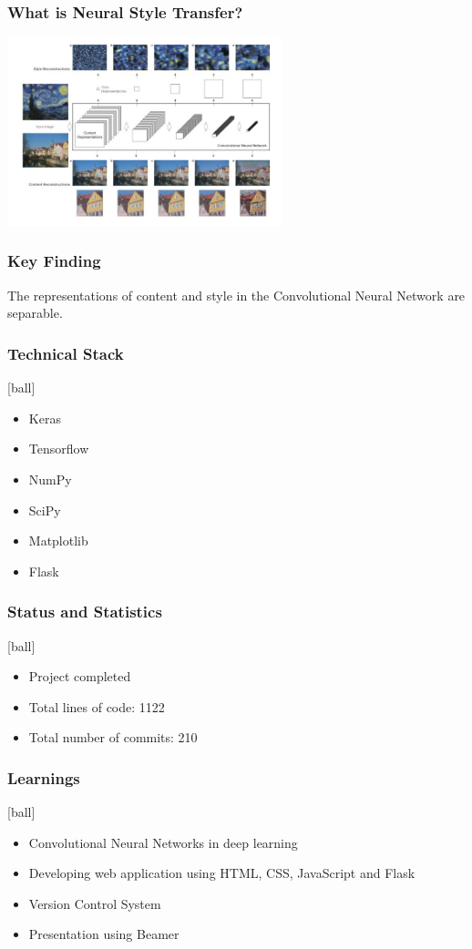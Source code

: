 \documentclass[14pt]{beamer}
\begin{document}
\begin{frame}
    \frametitle{What is Neural Style Transfer?}
    \begin{center}
        \includegraphics[width=80mm]{exp.jpg}
    \end{center}
\end{frame}

\begin{frame}
		\frametitle{Key Finding}
		The representations of content and style in the Convolutional Neural Network are separable.
\end{frame}

\begin{frame}
		\frametitle{Technical Stack}
		\begin{itemize}
		\item Keras 
        \item Tensorflow
		\item NumPy
		\item SciPy
        \item Matplotlib
		\item Flask  
		\end{itemize}
\end{frame}

\begin{frame}
		\frametitle{Status and Statistics}
		\begin{itemize}
		\item Project completed
        \item Total lines of code: 1122
		\item Total number of commits: 210
		\end{itemize}
\end{frame}

\begin{frame}
		\frametitle{Learnings}
        \begin{itemize}
		\item Convolutional Neural Networks in deep learning
        \item Developing web application using HTML, CSS, JavaScript and Flask
		\item Version Control System
		\item Presentation using Beamer
		\end{itemize}
\end{frame}
\end{document}
